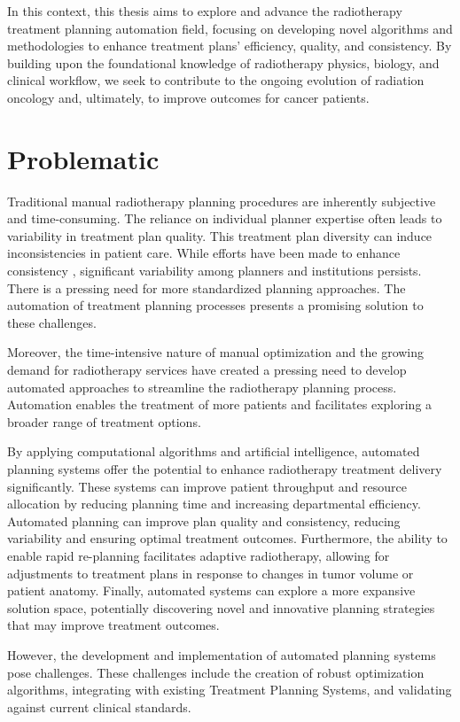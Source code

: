 In this context, this thesis aims to explore and advance the radiotherapy treatment planning automation field, focusing on developing novel algorithms and methodologies to enhance treatment plans' efficiency, quality, and consistency.
By building upon the foundational knowledge of radiotherapy physics, biology, and clinical workflow, we seek to contribute to the ongoing evolution of radiation oncology and, ultimately, to improve outcomes for cancer patients.

\section{Problematic}
Traditional manual radiotherapy planning procedures are inherently subjective and time-consuming.
The reliance on individual planner expertise often leads to variability in treatment plan quality\cite{Chung2008,Bohsung2005,Das2008,Williams2007}.
This treatment plan diversity can induce inconsistencies in patient care.
While efforts have been made to enhance consistency \cite{Bahm2011}, significant variability among planners and institutions persists.
There is a pressing need for more standardized planning approaches.
The automation of treatment planning processes presents a promising solution to these challenges.

Moreover, the time-intensive nature of manual optimization \cite{Zhang2020} and the growing demand for radiotherapy services have created a pressing need to develop automated approaches to streamline the radiotherapy planning process.
Automation enables the treatment of more patients and facilitates exploring a broader range of treatment options.

By applying computational algorithms and artificial intelligence, automated planning systems offer the potential to enhance radiotherapy treatment delivery significantly.
These systems can improve patient throughput and resource allocation by reducing planning time and increasing departmental efficiency.
Automated planning can improve plan quality and consistency, reducing variability and ensuring optimal treatment outcomes.
Furthermore, the ability to enable rapid re-planning facilitates adaptive radiotherapy, allowing for adjustments to treatment plans in response to changes in tumor volume or patient anatomy.
Finally, automated systems can explore a more expansive solution space, potentially discovering novel and innovative planning strategies that may improve treatment outcomes.

However, the development and implementation of automated planning systems pose challenges.
These challenges include the creation of robust optimization algorithms, integrating with existing Treatment Planning Systems, and validating against current clinical standards.

